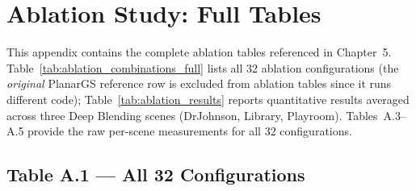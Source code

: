 \chapter{Ablation Study: Full Tables}
\label{appendix:ablation}

\newcommand{\gx}{\textcolor{gray!60}{\xmark}}

This appendix contains the complete ablation tables referenced in Chapter~5. Table~\ref{tab:ablation_combinations_full} lists all 32 ablation configurations (the \textit{original} PlanarGS reference row is excluded from ablation tables since it runs different code); Table~\ref{tab:ablation_results} reports quantitative results averaged across three Deep Blending scenes (DrJohnson, Library, Playroom). Tables~A.3--A.5 provide the raw per-scene measurements for all 32 configurations.

\section*{Table A.1 — All 32 Configurations}

